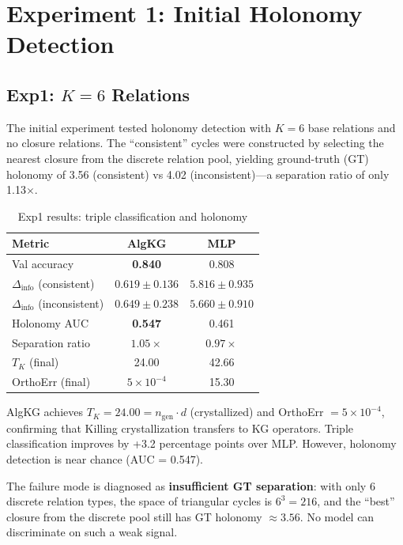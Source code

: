 \documentclass[11pt,letterpaper]{article}
\newcommand{\deltainfo}{\Delta_{\text{info}}}
\begin{document}
\section{Experiment 1: Initial Holonomy Detection}

\subsection{Exp1: $K = 6$ Relations}

The initial experiment tested holonomy detection with $K = 6$ base relations and no closure relations. The ``consistent'' cycles were constructed by selecting the nearest closure from the discrete relation pool, yielding ground-truth (GT) holonomy of 3.56 (consistent) vs 4.02 (inconsistent)---a separation ratio of only 1.13$\times$.

\begin{table}[H]
\centering
\caption{Exp1 results: triple classification and holonomy}
\begin{tabular}{@{}lcc@{}}
\toprule
\textbf{Metric} & \textbf{AlgKG} & \textbf{MLP} \\
\midrule
Val accuracy & \textbf{0.840} & 0.808 \\
$\deltainfo$ (consistent) & $0.619 \pm 0.136$ & $5.816 \pm 0.935$ \\
$\deltainfo$ (inconsistent) & $0.649 \pm 0.238$ & $5.660 \pm 0.910$ \\
Holonomy AUC & \textbf{0.547} & 0.461 \\
Separation ratio & $1.05\times$ & $0.97\times$ \\
$T_K$ (final) & 24.00 & 42.66 \\
OrthoErr (final) & $5 \times 10^{-4}$ & 15.30 \\
\bottomrule
\end{tabular}
\end{table}

AlgKG achieves $T_K = 24.00 = n_{\text{gen}} \cdot d$ (crystallized) and OrthoErr $= 5 \times 10^{-4}$, confirming that Killing crystallization transfers to KG operators. Triple classification improves by +3.2 percentage points over MLP. However, holonomy detection is near chance (AUC = 0.547).

The failure mode is diagnosed as \textbf{insufficient GT separation}: with only 6 discrete relation types, the space of triangular cycles is $6^3 = 216$, and the ``best'' closure from the discrete pool still has GT holonomy $\approx 3.56$. No model can discriminate on such a weak signal.
\end{document}
